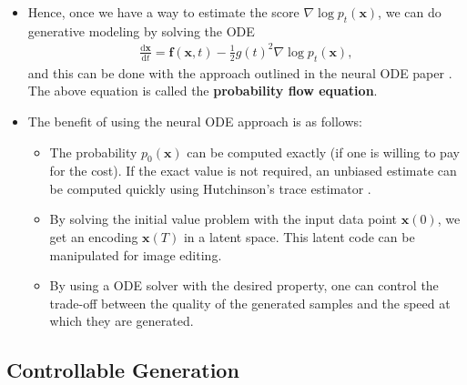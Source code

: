 \documentclass[10pt]{article}
\newcommand{\dee}{\mathrm{d}}
\newcommand{\ve}[1]{\mathbf{#1}}
\begin{document}
\begin{itemize}
  \item Hence, once we have a way to estimate the score $\nabla \log p_t(\ve{x})$, we can do generative modeling by solving the ODE
  \begin{align*}
    \frac{\dee \ve{x}}{\dee t} = \ve{f}(\ve{x},t) - \frac{1}{2} g(t)^2 \nabla \log p_t(\ve{x}),
  \end{align*}
  and this can be done with the approach outlined in the neural ODE paper \cite{Chen:2018}. The above equation is called the {\bf probability flow equation}.

  \item The benefit of using the neural ODE approach is as follows:
  \begin{itemize}
    \item The probability $p_0(\ve{x})$ can be computed exactly (if one is willing to pay for the cost). If the exact value is not required, an unbiased estimate can be computed quickly using Hutchinson's trace estimator \cite{Hutchinson:1989, Grathwohl:2018}.
    
    \item By solving the initial value problem with the input data point $\ve{x}(0)$, we get an encoding $\ve{x}(T)$ in a latent space. This latent code can be manipulated for image editing.
    
    \item By using a ODE solver with the desired property, one can control the trade-off between the quality of the generated samples and the speed at which they are generated.
  \end{itemize}
\end{itemize}

\subsection{Controllable Generation}
\end{document}

